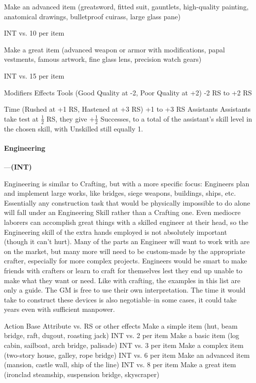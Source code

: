 \documentclass[oneside,11pt,english]{book}
\begin{document}
Make an advanced item (greatsword, fitted suit, 
gauntlets, high-quality painting, anatomical drawings, 
bulletproof cuirass, large glass pane) 

INT vs. 10 per item 

Make a great item (advanced weapon or armor with 
modifications, papal vestments, famous artwork, fine 
glass lens, precision watch gears) 

INT vs. 15 per item 

Modifiers Effects 
Tools (Good Quality at -2, Poor Quality at +2) -2 RS to +2 RS 


Time (Rushed at +1 RS, Hastened at +3 RS) +1 to +3 RS 
Assistants Assistants take test at $ \frac{1}{2} $ RS, they give +$ \frac{1}{2} $
Successes, to a total of the assistant’s skill level 
in the chosen skill, with Unskilled still equally 1. 


\paragraph{\label{skill:Engineering}Engineering}---\quad\textbf{(INT) }\par
Engineering is similar to Crafting, but with a more specific focus: Engineers plan and implement large works, like bridges, siege weapons, buildings, ships, etc. Essentially any construction task that would be physically impossible to do alone will fall under an Engineering Skill rather than a Crafting one. Even mediocre laborers can accomplish great things with a skilled engineer at their head, so the Engineering skill of the extra hands employed is not absolutely important (though it can’t hurt). Many of the parts an Engineer will want to work with are on the market, but many more will need to be custom-made by the appropriate crafter, especially for more complex projects. Engineers would be smart to make friends with crafters or learn to craft for themselves lest they end up unable to make what they want or need. Like with crafting, the examples in this list are only a guide. The GM is free to use their own interpretation. The time it would take to construct these devices is also negotiable--in some cases, it could take years even with sufficient manpower.


Action Base Attribute vs. RS or other 
effects 
Make a simple item (hut, beam bridge, raft, dugout, roasting jack) INT vs. 2 per item 
Make a basic item (log cabin, sailboat, arch bridge, palisade) INT vs. 3 per item 
Make a complex item (two-story house, galley, rope bridge) INT vs. 6 per item 
Make an advanced item (mansion, castle wall, ship of the line) INT vs. 8 per item 
Make a great item (ironclad steamship, suspension bridge, 
skyscraper) 
\end{document}
